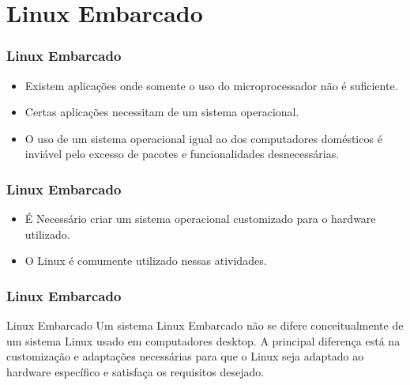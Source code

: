 \section{Linux Embarcado}

\begin{frame}
    \frametitle{Linux Embarcado}
    \begin{itemize}
        \item Existem aplicações onde somente o uso do 
        microprocessador não é suficiente.
        \item Certas aplicações necessitam de um sistema
        operacional.
        \item O uso de um sistema operacional igual ao dos
        computadores domésticos é inviável pelo excesso de 
        pacotes e funcionalidades desnecessárias.
    \end{itemize}
    

\end{frame}

\begin{frame}
    \frametitle{Linux Embarcado}
    \begin{itemize}
        \item É Necessário criar um sistema operacional customizado
        para o hardware utilizado.
        \item O Linux é comumente utilizado nessas atividades. 
    \end{itemize}
\end{frame}

\begin{frame}
    \frametitle{Linux Embarcado}
    \begin{block}{Linux Embarcado}
        Um sistema Linux Embarcado não se difere conceitualmente 
        de um sistema Linux usado em computadores desktop. A principal
        diferença está na customização e adaptações necessárias para 
        que o Linux seja adaptado ao hardware específico e satisfaça
        os requisitos desejado.
            
    \end{block}    
\end{frame}

